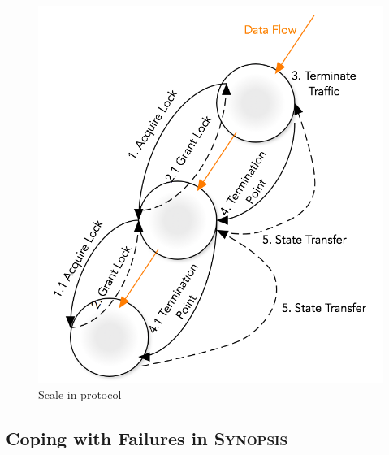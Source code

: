 \begin{figure}
    \centerline{\includegraphics[scale=0.55]{figures/scale-in-protocol.png}}
    \caption{Scale in protocol}
    \label{fig:scale-in-protocol}
\end{figure}



\subsection{Coping with Failures in \textsc{Synopsis}}


